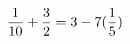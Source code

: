 \documentclass[preview]{standalone}
\begin{document}
\begin{align*}
\special{dvisvgm:raw <g id='unique000'>}\frac{1}{10} + \frac{3}{2} = 3 - 7(\frac{1}{5})\special{dvisvgm:raw </g>}
\end{align*}
\end{document}
